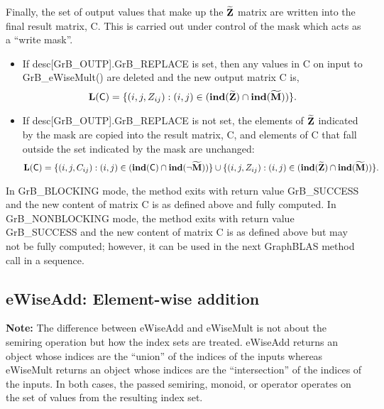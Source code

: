 Finally, the set of output values that make up the ${\bf \widetilde{Z}}$ 
matrix are written into the final result matrix, {\sf C}. 
This is carried out under control of the mask which acts as a ``write mask''.
\begin{itemize}
\item If {\sf desc[GrB\_OUTP].GrB\_REPLACE} is set, then any values in {\sf C} 
on input to {\sf GrB\_eWiseMult()} are deleted and the new output matrix {\sf C} is,
\[ \bold{L}({\sf C}) = \{(i,j,Z_{ij}) : (i,j) \in (\bold{ind}({\bf \widetilde{Z}}) 
\cap \bold{ind}({\bf \widetilde{M}})) \}. \]

\item If {\sf desc[GrB\_OUTP].GrB\_REPLACE} is not set, the elements of 
${\bf \widetilde{Z}}$ indicated by 
the mask are copied into the result matrix, {\sf C}, and elements of 
{\sf C} that fall outside the set indicated by the mask are unchanged:
\[ \bold{L}({\sf C}) = \{(i,j,C_{ij}) : (i,j) \in (\bold{ind}({\sf C}) 
\cap \bold{ind}(\neg {\bf \widetilde{M}})) \} \cup \{(i,j,Z_{ij}) : (i,j) \in 
(\bold{ind}({\bf \widetilde{Z}}) \cap \bold{ind}({\bf \widetilde{M}})) \}. \]
\end{itemize}

In {\sf GrB\_BLOCKING} mode, the method exits with return value 
{\sf GrB\_SUCCESS} and the new content of matrix {\sf C} is as defined above
and fully computed.  
In {\sf GrB\_NONBLOCKING} mode, the method exits with return value 
{\sf GrB\_SUCCESS} and the new content of matrix {\sf C} is as defined above 
but may not be fully computed; however, it can be used in the next GraphBLAS 
method call in a sequence.




\subsection{{\sf eWiseAdd}: Element-wise addition}

{\bf Note:} The difference between {\sf eWiseAdd} and {\sf eWiseMult} is not 
about the semiring operation but how the index sets are treated.
{\sf eWiseAdd} returns an object whose indices are the ``union'' of the indices 
of the inputs whereas  
{\sf eWiseMult} returns an object whose indices are the ``intersection'' of the 
indices of the inputs. In both cases, the passed semiring, monoid, or operator 
operates on the set of values from the resulting index set. 

